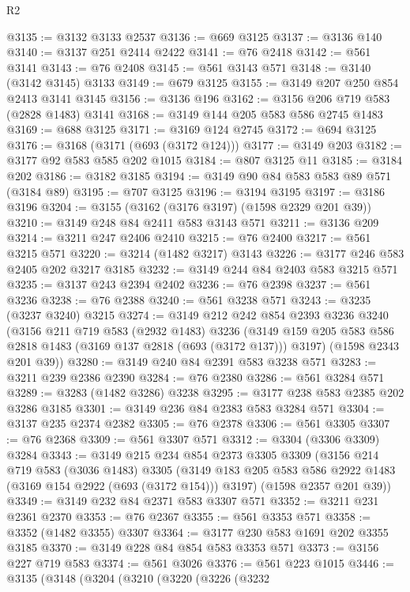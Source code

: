 \begin{lexlean}{R2}
\begin{coremodule}
@3135 := @3132 @3133 @2537
@3136 := @669 @3125
@3137 := @3136 @140
@3140 := @3137 @251 @2414 @2422
@3141 := @76 @2418
@3142 := @561 @3141
@3143 := @76 @2408
@3145 := @561 @3143 @571
@3148 := @3140 (@3142 @3145) @3133
@3149 := @679 @3125
@3155 := @3149 @207 @250 @854 @2413 @3141 @3145
@3156 := @3136 @196
@3162 := @3156 @206 @719 @583 (@2828 @1483) @3141
@3168 := @3149 @144 @205 @583 @586 @2745 @1483
@3169 := @688 @3125
@3171 := @3169 @124 @2745
@3172 := @694 @3125
@3176 := @3168 (@3171 (@693 (@3172 @124)))
@3177 := @3149 @203
@3182 := @3177 @92 @583 @585 @202 @1015
@3184 := @807 @3125 @11
@3185 := @3184 @202
@3186 := @3182 @3185
@3194 := @3149 @90 @84 @583 @583 @89 @571 (@3184 @89)
@3195 := @707 @3125
@3196 := @3194 @3195
@3197 := @3186 @3196
@3204 := @3155 (@3162 (@3176 @3197) (@1598 @2329 @201 @39))
@3210 := @3149 @248 @84 @2411 @583 @3143 @571
@3211 := @3136 @209
@3214 := @3211 @247 @2406 @2410
@3215 := @76 @2400
@3217 := @561 @3215 @571
@3220 := @3214 (@1482 @3217) @3143
@3226 := @3177 @246 @583 @2405 @202 @3217 @3185
@3232 := @3149 @244 @84 @2403 @583 @3215 @571
@3235 := @3137 @243 @2394 @2402
@3236 := @76 @2398
@3237 := @561 @3236
@3238 := @76 @2388
@3240 := @561 @3238 @571
@3243 := @3235 (@3237 @3240) @3215
@3274 := @3149
    @212
    @242
    @854
    @2393
    @3236
    @3240
    (@3156
      @211
      @719
      @583
      (@2932 @1483)
      @3236
      (@3149 @159 @205 @583 @586 @2818 @1483 (@3169 @137 @2818 (@693 (@3172 @137))) @3197)
      (@1598 @2343 @201 @39))
@3280 := @3149 @240 @84 @2391 @583 @3238 @571
@3283 := @3211 @239 @2386 @2390
@3284 := @76 @2380
@3286 := @561 @3284 @571
@3289 := @3283 (@1482 @3286) @3238
@3295 := @3177 @238 @583 @2385 @202 @3286 @3185
@3301 := @3149 @236 @84 @2383 @583 @3284 @571
@3304 := @3137 @235 @2374 @2382
@3305 := @76 @2378
@3306 := @561 @3305
@3307 := @76 @2368
@3309 := @561 @3307 @571
@3312 := @3304 (@3306 @3309) @3284
@3343 := @3149
    @215
    @234
    @854
    @2373
    @3305
    @3309
    (@3156
      @214
      @719
      @583
      (@3036 @1483)
      @3305
      (@3149 @183 @205 @583 @586 @2922 @1483 (@3169 @154 @2922 (@693 (@3172 @154))) @3197)
      (@1598 @2357 @201 @39))
@3349 := @3149 @232 @84 @2371 @583 @3307 @571
@3352 := @3211 @231 @2361 @2370
@3353 := @76 @2367
@3355 := @561 @3353 @571
@3358 := @3352 (@1482 @3355) @3307
@3364 := @3177 @230 @583 @1691 @202 @3355 @3185
@3370 := @3149 @228 @84 @854 @583 @3353 @571
@3373 := @3156 @227 @719 @583
@3374 := @561 @3026
@3376 := @561 @223 @1015
@3446 := @3135
    (@3148
      (@3204
        (@3210
          (@3220
            (@3226
              (@3232

\end{coremodule}
\end{lexlean}
